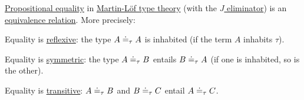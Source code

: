 \begin{proposition}\label{thm:propositional_equality_equivalence_relation}
  \hyperref[def:mltt_propositional_equality]{Propositional equality} in \hyperref[def:mltt]{Martin-L\"of type theory} (with the \hyperref[def:identity_type/j]{\( J \) eliminator}) is an \hyperref[def:equivalence_relation]{equivalence relation}. More precisely:
  \begin{thmenum}
     Equality is \hyperref[def:relation_closures/reflexive]{reflexive}: the type \( A \doteq_\tau A \) is inhabited (if the term \( A \) inhabits \( \tau \)).

     Equality is \hyperref[def:relation_closures/symmetric]{symmetric}: the type \( A \doteq_\tau B \) entails \( B \doteq_\tau A \) (if one is inhabited, so is the other).

     Equality is \hyperref[def:relation_closures/transitive]{transitive}: \( A \doteq_\tau B \) and \( B \doteq_\tau C \) entail \( A \doteq_\tau C \).
  \end{thmenum}
\end{proposition}
